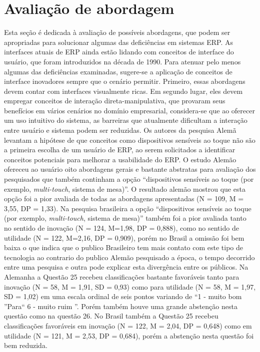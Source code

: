 \section{Avaliação de abordagem}

Esta seção é dedicada à avaliação de possíveis abordagens, que podem ser apropriadas para solucionar algumas das deficiências em sistemas ERP.\newline
\indent As interfaces atuais de ERP ainda estão lidando com conceitos de interface do usuário, que foram introduzidos na década de 1990. Para atenuar pelo menos algumas das deficiências examinadas, sugere-se a aplicação de conceitos de interface inovadores sempre que o cenário permitir. Primeiro, essas abordagens devem contar com interfaces visualmente ricas. Em segundo lugar, eles devem empregar conceitos de interação direta-manipulativa, que provaram seus benefícios em vários cenários no domínio empresarial, considera-se que ao oferecer um uso intuitivo do sistema, as barreiras que atualmente dificultam a interação entre usuário e sistema podem ser reduzidas.\newline
\indent Os autores da pesquisa Alemã levantam a hipótese de que conceitos como dispositivos sensíveis ao toque não são a primeira escolha de um usuário de ERP, ao serem solicitados a identificar conceitos potenciais para melhorar a usabilidade do ERP. O estudo Alemão ofereceu ao usuário oito abordagens gerais e bastante abstratas para avaliação dos pesquisados que também continham a opção “dispositivos sensíveis ao toque (por exemplo, \textit{multi-touch}, sistema de mesa)”. O resultado alemão mostrou que esta opção foi a pior avaliada de todas as abordagens apresentadas (N = 109, M = 3,55, DP = 1,33). Na pesquisa  brasileira a opção “dispositivos sensíveis ao toque (por exemplo, \textit{multi-touch}, sistema de mesa)” também foi a pior avaliada  tanto no sentido de inovação (N = 124, M=1,98, DP = 0,888), como no sentido de utilidade (N = 122, M=2,16, DP = 0,909), porém no Brasil a omissão foi bem baixa  o que indica que o publico Brasileiro tem mais contato com este tipo de tecnologia ao contrario do publico Alemão pesquisado a época, o tempo decorrido entre uma pesquisa e outra pode explicar esta divergência entre os públicos.\newline
\indent Na Alemanha a Questão 25 recebeu classificações bastante favoráveis tanto para inovação (N = 58, M = 1,91, SD = 0,93) como para utilidade (N = 58, M = 1,97, SD = 1,02) em uma escala ordinal de seis pontos variando de “1 - muito bom ”Para“ 6 - muito ruim ”. Porém também houve uma grande abstenção nesta questão como na questão 26. No Brasil também a Questão 25 recebeu classificações favoráveis em inovação (N = 122, M = 2,04, DP = 0,648) como em utilidade (N = 121, M = 2,53, DP = 0,684), porém a abstenção nesta questão foi bem reduzida.

